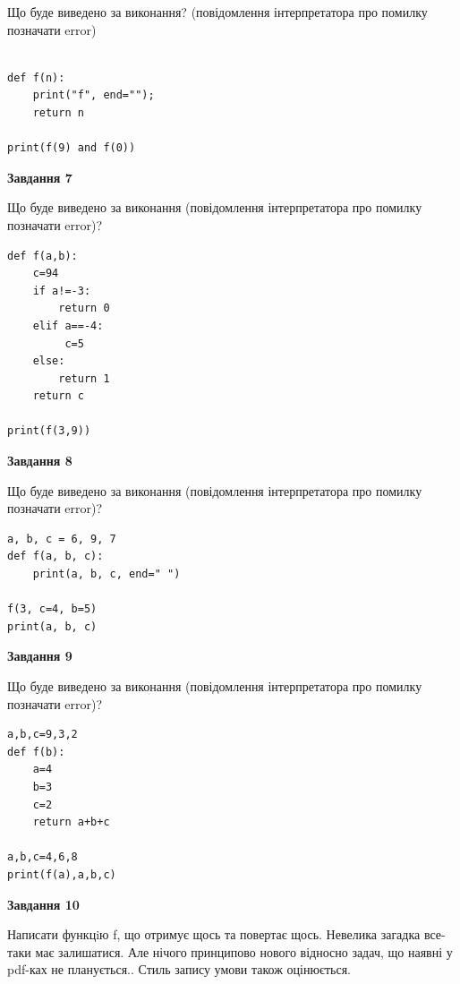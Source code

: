 \documentclass[12pt, ukrainian]{article}
\begin{document}
{\begin {large}
Що буде виведено за виконання? (повідомлення інтерпретатора про помилку позначати error)\par
\begin{verbatim}

def f(n):
    print("f", end="");
    return n

print(f(9) and f(0))
\end{verbatim}

{\begin {center}\textbf{Завдання 7}\end {center}}

Що буде виведено за виконання (повідомлення інтерпретатора про помилку позначати error)?\par
\begin{verbatim}
def f(a,b):
    c=94
    if a!=-3:
        return 0
    elif a==-4:
         c=5
    else: 
        return 1
    return c

print(f(3,9))
\end{verbatim}

{\begin {center}\textbf{Завдання 8}\end {center}}

Що буде виведено за виконання (повідомлення інтерпретатора про помилку позначати error)?\par
\begin{verbatim}
a, b, c = 6, 9, 7
def f(a, b, c):
    print(a, b, c, end=" ")

f(3, c=4, b=5)
print(a, b, c)
\end{verbatim}

{\begin {center}\textbf{Завдання 9}\end {center}}

Що буде виведено за виконання (повідомлення інтерпретатора про помилку позначати error)?\par
\begin{verbatim}
a,b,c=9,3,2
def f(b):
    a=4
    b=3
    c=2
    return a+b+c

a,b,c=4,6,8
print(f(a),a,b,c)
\end{verbatim}

{\begin {center}\textbf{Завдання 10}\end {center}}


Написати функцiю f, що отримує щось та повертає щось. Невелика загадка все-таки має залишатися. Але нічого принципово нового відносно задач, що наявні у pdf-ках не планується.. Стиль запису умови також оцінюється.\par
\end {large}}
\newpage
\end{document}
